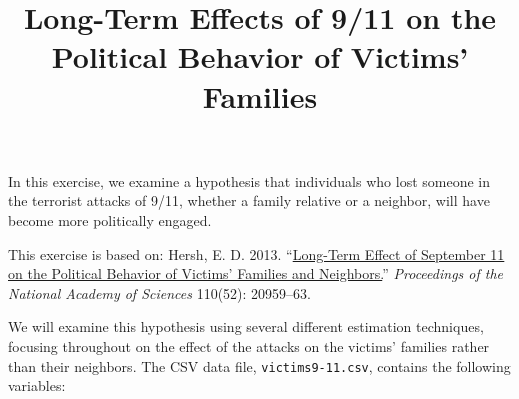\documentclass[]{article}
\title{Long-Term Effects of 9/11 on the Political Behavior of Victims' Families}
\author{}
\date{}
\begin{document}
\maketitle


In this exercise, we examine a hypothesis that individuals who lost
someone in the terrorist attacks of 9/11, whether a family relative or a
neighbor, will have become more politically engaged.

This exercise is based on: Hersh, E. D. 2013.
``\href{http://dx.doi.org/10.1073/pnas.1315043110}{Long-Term Effect of
September 11 on the Political Behavior of Victims' Families and
Neighbors.}'' \emph{Proceedings of the National Academy of Sciences}
110(52): 20959--63.

We will examine this hypothesis using several different estimation
techniques, focusing throughout on the effect of the attacks on the
victims' families rather than their neighbors. The CSV data file,
\texttt{victims9-11.csv}, contains the following variables:
\end{document}
